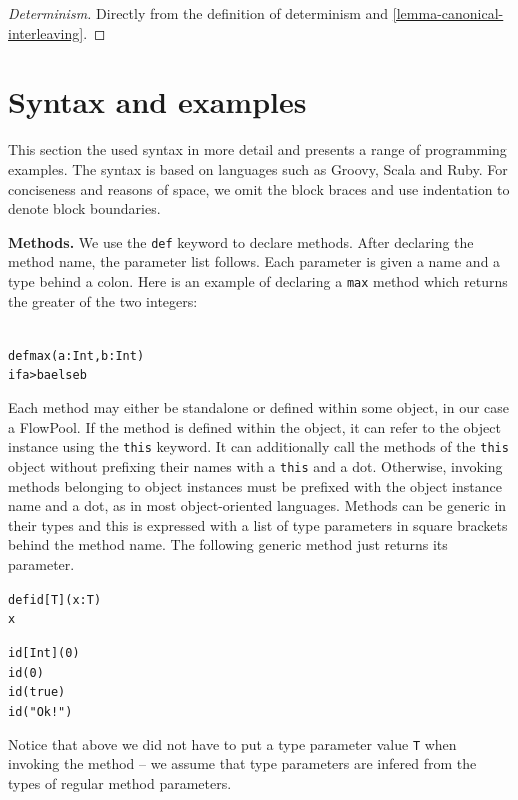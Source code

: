 \documentclass[runningheads,a4paper]{llncs}
\begin{document}
\begin{proof}[Determinism]
Directly from the definition of determinism and
\ref{lemma-canonical-interleaving}.
\end{proof}




\section{Syntax and examples}

This section the used syntax in more detail and presents a range of programming
examples.
The syntax is based on languages such as Groovy, Scala and Ruby.
For conciseness and reasons of space, we omit the block braces and use indentation
to denote block boundaries.

\textbf{Methods.}
We use the \verb=def= keyword to declare methods.
After declaring the method name, the parameter list follows.
Each parameter is given a name and a type behind a colon.
Here is an example of declaring a \verb=max= method which returns the greater
of the two integers:

\begin{minipage}[b]{3.75 cm}
\begin{alltt}
{\scriptsize
def max(a: Int, b: Int)
  if a > b a else b
}
\end{alltt}
\end{minipage}


Each method may either be standalone or defined within some object, in our case
a FlowPool.
If the method is defined within the object, it can refer to the object instance
using the \verb=this= keyword.
It can additionally call the methods of the \verb=this= object without prefixing
their names with a \verb=this= and a dot.
Otherwise, invoking methods belonging to object instances must be prefixed with
the object instance name and a dot, as in most object-oriented languages.
Methods can be generic in their types and this is expressed with a list of
type parameters in square brackets behind the method name.
The following generic method just returns its parameter.

\begin{minipage}[b]{3.75 cm}
\begin{alltt}
{\scriptsize
def id[T](x: T)
  x

id[Int](0)
id(0)
id(true)
id("Ok!")
}
\end{alltt}
\end{minipage}

Notice that above we did not have to put a type parameter value \verb=T= when
invoking the method -- we assume that type parameters are infered from the
types of regular method parameters.
\end{document}
